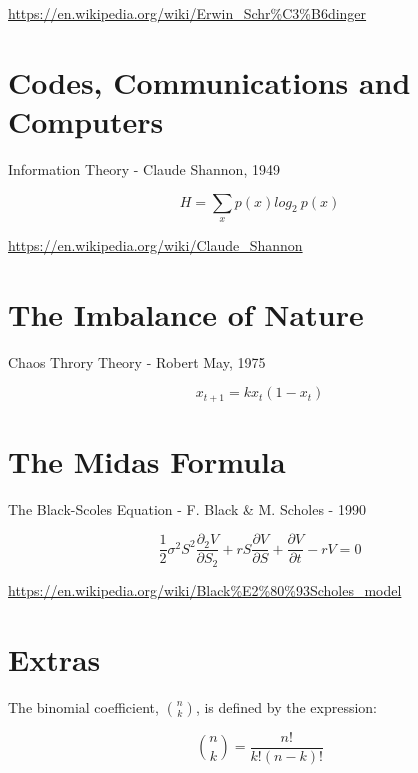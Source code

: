 \documentclass[12pt]{article}
\begin{document}
\vspace{2em}

\url{https://en.wikipedia.org/wiki/Erwin_Schr%C3%B6dinger}

\newpage


\section{Codes, Communications and Computers}

Information Theory - Claude Shannon, 1949

\vspace{2em}

\begin{equation*} H = \sum_{x} p(x) log_{2}\ p(x) \end{equation*}

\vspace{2em}

\url{https://en.wikipedia.org/wiki/Claude_Shannon}

\newpage


\section{The Imbalance of Nature}

Chaos Throry Theory - Robert May, 1975

\vspace{2em}

\begin{equation*} x_{t+1}  = kx_t ( 1 - x_t) \end{equation*}

\vspace{2em}

\url{}

\newpage



\section{The Midas Formula}
				
The Black-Scoles Equation - F. Black \& M. Scholes - 1990

\vspace{2em}

\begin{equation*}  \frac{1}{2} \sigma^2 S^2 \frac{\partial_2V}{\partial{S_2}} + r S \frac{\partial{V}}{\partial{S}} +  \frac{\partial{V}}{\partial{t}} - r V = 0 \end{equation*}

\vspace{2em}

\url{https://en.wikipedia.org/wiki/Black%E2%80%93Scholes_model}

\newpage 
	


	
\section*{Extras}



The binomial coefficient, \(\binom{n}{k}\), is defined by the expression:

\[
\binom{n}{k} = \frac{n!}{k!(n-k)!}
\]
	
\end{document}
